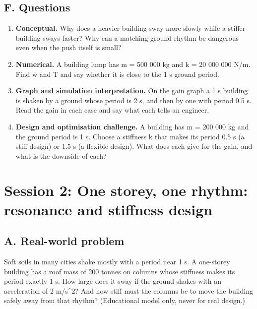 \documentclass[11pt,a4paper]{article}
\begin{document}
\subsection*{F. Questions}
\begin{enumerate}[nosep]
\item \textbf{Conceptual.} Why does a heavier building sway more slowly while a stiffer building sways faster? Why can a matching ground rhythm be dangerous even when the push itself is small?
\item \textbf{Numerical.} A building lump has m = 500 000 kg and k = 20 000 000 N/m. Find w and T and say whether it is close to the 1 s ground period.
\item \textbf{Graph and simulation interpretation.} On the gain graph a 1 s building is shaken by a ground whose period is 2 s, and then by one with period 0.5 s. Read the gain in each case and say what each tells an engineer.
\item \textbf{Design and optimisation challenge.} A building has m = 200 000 kg and the ground period is 1 s. Choose a stiffness k that makes its period 0.5 s (a stiff design) or 1.5 s (a flexible design). What does each give for the gain, and what is the downside of each?
\end{enumerate}

\section{Session 2: One storey, one rhythm: resonance and stiffness design}

\subsection*{A. Real-world problem}
Soft soils in many cities shake mostly with a period near 1 s. A one-storey building has a roof mass of 200 tonnes on columns whose stiffness makes its period exactly 1 s. How large does it sway if the ground shakes with an acceleration of 2 m/s\textasciicircum{}2? And how stiff must the columns be to move the building safely away from that rhythm? (Educational model only, never for real design.)
\end{document}
